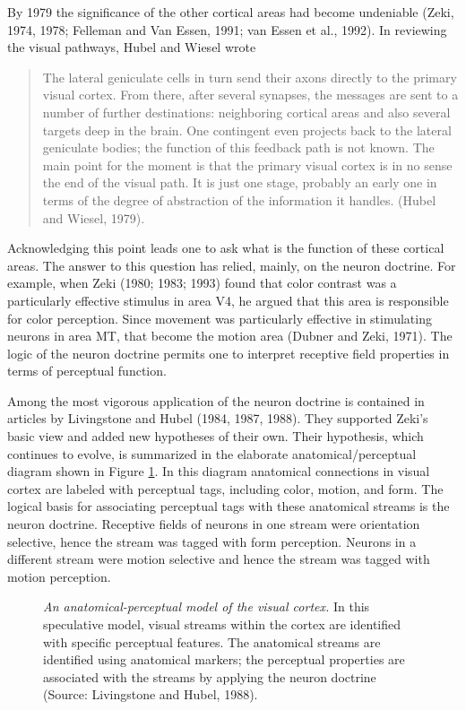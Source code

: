By 1979 the significance of the 
other cortical areas had become undeniable
(Zeki, 1974, 1978; Felleman and Van Essen, 1991; van Essen et al., 1992).
In reviewing the visual pathways, Hubel and Wiesel wrote
\begin{quote}
The lateral geniculate cells in turn send their
axons directly to the primary visual cortex.
From there, after several synapses, the messages are
sent to a number of further destinations:  neighboring cortical areas
and also several targets deep in the brain.
One contingent even projects back to the lateral geniculate bodies;
the function of this feedback path is not known.
The main point for the moment is that the primary visual
cortex is in no sense the end of the visual path.
It is just one stage, probably an early one in terms of the degree of
abstraction of the information it handles.  (Hubel and Wiesel, 1979).
\end{quote}

Acknowledging this point leads one to ask what 
is the function of these cortical areas.
The answer to this question
has relied, mainly, on the neuron doctrine.
For example, when Zeki (1980; 1983; 1993) found that
color contrast was a particularly effective
stimulus in area V4,
he argued that this area is responsible for color perception.
Since movement was particularly effective in 
stimulating neurons in area MT,
that become the motion area (Dubner and Zeki, 1971).
The logic of the neuron doctrine permits one to
interpret receptive field properties in terms of
perceptual function.

Among the most vigorous application of the neuron
doctrine is contained in articles by
Livingstone and Hubel (1984, 1987, 1988).
They supported Zeki's basic view and added new hypotheses of their own.
Their hypothesis, which continues to evolve,
is summarized in the elaborate
anatomical/perceptual diagram
shown in Figure \ref{f5:specialization}.
In this diagram
anatomical connections in visual cortex are
labeled with perceptual tags, including color, motion, and
form.
The logical basis for associating perceptual tags
with these anatomical streams is the neuron doctrine.
Receptive fields of neurons in one stream were orientation selective,
hence the stream was tagged with form perception.
Neurons in a different stream were motion selective
and hence the stream was tagged with motion perception.
\begin{figure}
\centerline{
}
\caption[Functional Specialization]{
{\em An anatomical-perceptual model of the visual cortex.}
In this speculative model,
visual streams within the cortex are identified with
specific perceptual features.
The anatomical streams are identified using anatomical markers;
the perceptual properties are associated with the streams
by applying the neuron doctrine
(Source: Livingstone and Hubel, 1988).
}
\label{f5:specialization}
\end{figure}

